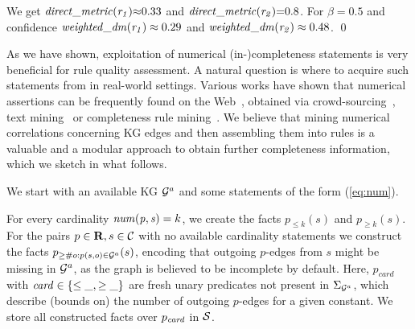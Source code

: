 \begin{example}
We get $\mathit{direct\_metric(r_1)}{\approx} 0.33$ and $\mathit{direct\_metric(r_2)}{=}0.8$. %
For $\beta=0.5$ and %
confidence %
$\mathit{weighted\_dm(r_1)} \approx 0.29$ and $\mathit{weighted\_dm(r_2)} \approx 0.48$. \qed
\end{example}

\label{sec:acquisition-numerical}
As we have shown, exploitation of numerical (in-)completeness statements is very beneficial for rule quality assessment. 
A natural question is where to acquire such statements from in real-world settings.  
Various works have shown that numerical 
assertions can be 
frequently found on the Web~\cite{rdfcomp}, %
obtained via crowd-sourcing~\cite{DarariREN16}, text mining~\cite{paramita-acl-2017} or completeness rule mining~\cite{galarragapredicting}. 
We believe that mining %
numerical correlations concerning KG edges and then 
assembling %
them into rules %
is a valuable and a %
modular approach to obtain further completeness information, which we sketch in what follows. 

We start with an available KG $\mathcal{G}^a$ and some statements of the form (\ref{eq:num}).



 For every cardinality  $\mathit{num(p,s)}=k$, we create the facts $p_{\leq k}(s)$ and $p_{\geq k}(s)$. For the pairs $p\in\mathbf{R},s\in\mathcal{C}$  with no available cardinality statements we construct the facts $p_{\geq \# o: p(s,o)\in \mathcal{G}^a}(s)$,  encoding that outgoing $p$-edges from $s$ might be %
missing in $\mathcal{G}^a$, as the graph is believed to be incomplete by default.
Here, $p_{card}$ with $\mathit{card\in \{\leq \_, \geq \_\}}$ are fresh unary predicates not present in $\Sigma_{\mathcal{G}^a}$, which describe (bounds on) the number of outgoing $p$-edges for a given constant. We store all constructed facts over $p_{\mathit{card}}$ in %
$\mathcal{S}$.
 
